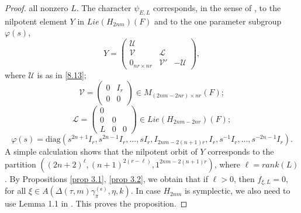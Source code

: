\documentclass[12pts]{amsart}
\newcommand{\diag}{{\mathrm{diag}}}
\begin{document}
\begin{proof}
	all nonzero $L$. The character $\psi_{E,L}$ corresponds, in the
	sense of \cite{MW87}, to the nilpotent element $Y$ in
	$Lie(H_{2nm})(F)$ and to the one parameter subgroup
	$\varphi(s)$,
	\begin{equation}\label{8.21}
	Y=\begin{pmatrix}\mathcal{U}\\
	\mathcal{V}&\mathcal{L}\\0_{nr\times
		nr}&\mathcal{V}'&-\mathcal{U}\end{pmatrix},
	\end{equation}
	where $\mathcal{U}$ is as in \eqref{8.13};
	$$
	\mathcal{V}=\begin{pmatrix}0&I_r\\0&0\end{pmatrix}\in
	M_{(2nm-2nr)\times nr}(F);
	$$
	$$
	\mathcal{L}=\begin{pmatrix}0\\0&0\\L&0&0\end{pmatrix}\in
	Lie(H_{2nm-2nr})(F);
	$$
	$$
	\varphi(s)=\diag(s^{2n+1}I_r,s^{2n-1}I_r,...,sI_r,
	I_{2nm-2(n+1)r},I_r,s^{-1}I_r,...,s^{-2n-1}I_r).
	$$
	A simple calculation shows that the nilpotent orbit of $Y$
	corresponds to the partition $((2n+2)^\ell,
	(n+1)^{2(r-\ell)},1^{2nm-2(n+1)r})$, where $\ell=rank(L)$. By
	Propositions \ref{prop 3.1},  \ref{prop 3.2}, we obtain that if $\ell>0$, then
	$f_{\xi,L}=0$, for all $\xi\in A(\Delta(\tau,m)\gamma_\pi^{(\epsilon)},\eta,k)$. In case $H_{2nm}$ is symplectic, we also need to use Lemma 1.1 in \cite{GRS03}.  This proves the proposition.
\end{proof}
\end{document}
